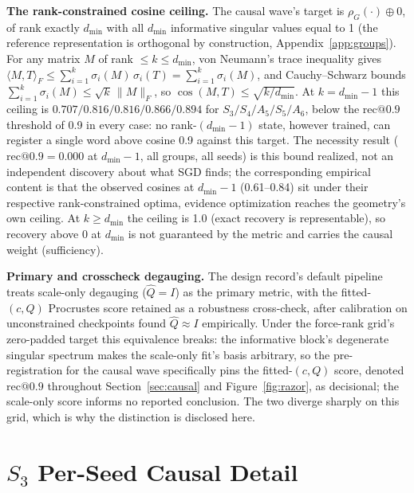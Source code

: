 \documentclass{article}
\makeatletter
\newcommand{\dmin}{d_{\min}}
\newcommand{\recninety}{\mathrm{rec}@0.9}
\makeatother
\begin{document}
\textbf{The rank-constrained cosine ceiling.} The causal wave's target
is $\rho_G(\cdot) \oplus 0$, of rank exactly $\dmin$ with all $\dmin$
informative singular values equal to 1 (the reference representation is
orthogonal by construction, Appendix~\ref{app:groups}). For any matrix
$M$ of rank $\leq k \leq \dmin$, von Neumann's trace inequality gives
$\langle M, T\rangle_F \leq \sum_{i=1}^{k} \sigma_i(M)\,\sigma_i(T) =
\sum_{i=1}^{k} \sigma_i(M)$, and Cauchy--Schwarz bounds
$\sum_{i=1}^{k} \sigma_i(M) \leq \sqrt{k}\,\lVert M \rVert_F$, so
$\cos(M, T) \leq \sqrt{k/\dmin}$. At $k = \dmin{-}1$ this ceiling is
$0.707/0.816/0.816/0.866/0.894$ for $S_3/S_4/A_5/S_5/A_6$, below the
$\recninety$ threshold of 0.9 in every case: no rank-$(\dmin{-}1)$
state, however trained, can register a single word above cosine 0.9
against this target. The necessity result ($\recninety = 0.000$ at
$\dmin{-}1$, all groups, all seeds) is this bound realized, not an
independent discovery about what SGD finds; the corresponding empirical
content is that the observed cosines at $\dmin{-}1$ (0.61--0.84) sit
under their respective rank-constrained optima, evidence optimization
reaches the geometry's own ceiling. At $k \geq \dmin$ the ceiling is
1.0 (exact recovery is representable), so recovery above 0 at $\dmin$
is not guaranteed by the metric and carries the causal weight
(sufficiency).

\textbf{Primary and crosscheck degauging.} The design record's default
pipeline treats scale-only degauging ($\hat{Q} = I$) as the primary
metric, with the fitted-$(c, Q)$ Procrustes score retained as a
robustness cross-check, after calibration on unconstrained checkpoints
found $\hat{Q} \approx I$ empirically. Under the force-rank grid's
zero-padded target this equivalence breaks: the informative block's
degenerate singular spectrum makes the scale-only fit's basis
arbitrary, so the pre-registration for the causal wave specifically
pins the fitted-$(c, Q)$ score, denoted $\recninety$ throughout
Section~\ref{sec:causal} and Figure~\ref{fig:razor}, as decisional; the
scale-only score informs no reported conclusion. The two diverge
sharply on this grid, which is why the distinction is disclosed here.

\section{$S_3$ Per-Seed Causal Detail}
\label{app:s3causal}
\end{document}
